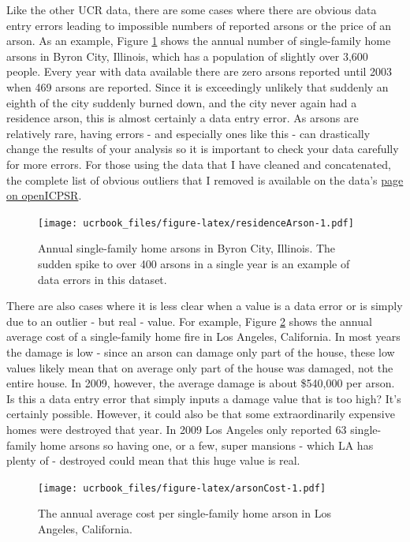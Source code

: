 \documentclass[
  12pt,
  openany]{book}
\begin{document}
Like the other UCR data, there are some cases where there are obvious data entry errors leading to impossible numbers of reported arsons or the price of an arson. As an example, Figure \ref{fig:residenceArson} shows the annual number of single-family home arsons in Byron City, Illinois, which has a population of slightly over 3,600 people. Every year with data available there are zero arsons reported until 2003 when 469 arsons are reported. Since it is exceedingly unlikely that suddenly an eighth of the city suddenly burned down, and the city never again had a residence arson, this is almost certainly a data entry error. As arsons are relatively rare, having errors - and especially ones like this - can drastically change the results of your analysis so it is important to check your data carefully for more errors. For those using the data that I have cleaned and concatenated, the complete list of obvious outliers that I removed is available on the data's \href{https://www.openicpsr.org/openicpsr/project/103540/version/V9/view}{page on openICPSR}.

\begin{figure}
\centering
\texttt{[image: ucrbook\_files/figure-latex/residenceArson-1.pdf]}
\caption{\label{fig:residenceArson}Annual single-family home arsons in Byron City, Illinois. The sudden spike to over 400 arsons in a single year is an example of data errors in this dataset.}
\end{figure}

There are also cases where it is less clear when a value is a data error or is simply due to an outlier - but real - value. For example, Figure \ref{fig:arsonCost} shows the annual average cost of a single-family home fire in Los Angeles, California. In most years the damage is low - since an arson can damage only part of the house, these low values likely mean that on average only part of the house was damaged, not the entire house. In 2009, however, the average damage is about \$540,000 per arson. Is this a data entry error that simply inputs a damage value that is too high? It's certainly possible. However, it could also be that some extraordinarily expensive homes were destroyed that year. In 2009 Los Angeles only reported 63 single-family home arsons so having one, or a few, super mansions - which LA has plenty of - destroyed could mean that this huge value is real.

\begin{figure}
\centering
\texttt{[image: ucrbook\_files/figure-latex/arsonCost-1.pdf]}
\caption{\label{fig:arsonCost}The annual average cost per single-family home arson in Los Angeles, California.}
\end{figure}
\end{document}
